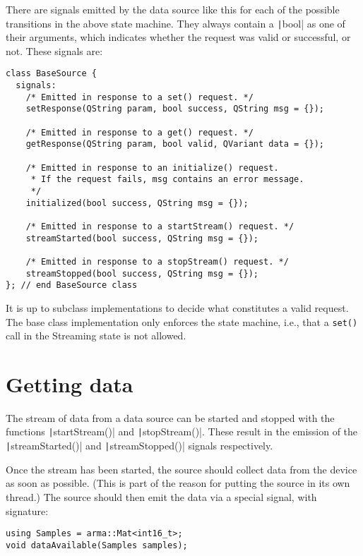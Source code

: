 \documentclass[12pt]{article}
\begin{document}
There are signals emitted by the data source like this for each of
the possible transitions in the above state machine. They always contain
a \texttt|bool| as one of their arguments, which indicates
whether the request was valid or successful, or not. These signals are:

\begin{verbatim}
class BaseSource {
  signals:
    /* Emitted in response to a set() request. */
    setResponse(QString param, bool success, QString msg = {});
  
    /* Emitted in response to a get() request. */
    getResponse(QString param, bool valid, QVariant data = {});
  
    /* Emitted in response to an initialize() request.
     * If the request fails, msg contains an error message.
     */
    initialized(bool success, QString msg = {});
  
    /* Emitted in response to a startStream() request. */
    streamStarted(bool success, QString msg = {});
  
    /* Emitted in response to a stopStream() request. */
    streamStopped(bool success, QString msg = {});
}; // end BaseSource class
\end{verbatim}

It is up to subclass implementations to decide what constitutes a valid
request. The base class implementation only enforces the state machine, i.e.,
that a \texttt{set()} call in the Streaming state is not allowed.

\section*{Getting data}

The stream of data from a data source can be started and stopped with the
functions \texttt|startStream()| and \texttt|stopStream()|.
These result in the emission of the \texttt|streamStarted()| and
\texttt|streamStopped()| signals respectively.

Once the stream has been started, the source should collect data from the
device as soon as possible. (This is part of the reason for putting the
source in its own thread.) The source should then emit the data via a special
signal, with signature:

\begin{verbatim}
using Samples = arma::Mat<int16_t>;
void dataAvailable(Samples samples);
\end{verbatim}
\end{document}
